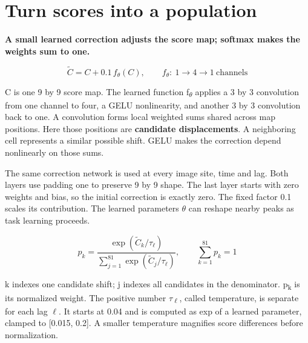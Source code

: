 \documentclass[11pt,letterpaper]{article}
\begin{document}
\clearpage
\section{Turn scores into a population}\label{sec7}

\textbf{A small learned correction adjusts the score map; softmax makes the weights sum to one.}


\begin{equation}\widetilde C=C+0.1\,f_\theta(C),\qquad f_\theta:\ 1\to4\to1\ \mathrm{channels}\end{equation}

C is one 9 by 9 score map. The learned function f\textsubscript{\(\theta\)} applies a 3 by 3 convolution from one channel to four, a GELU nonlinearity, and another 3 by 3 convolution back to one. A convolution forms local weighted sums shared across map positions. Here those positions are \textbf{candidate displacements}. A neighboring cell represents a similar possible shift. GELU makes the correction depend nonlinearly on those sums.


The same correction network is used at every image site, time and lag. Both layers use padding one to preserve 9 by 9 shape. The last layer starts with zero weights and bias, so the initial correction is exactly zero. The fixed factor 0.1 scales its contribution. The learned parameters \(\theta\) can reshape nearby peaks as task learning proceeds.


\begin{equation}p_k=\frac{\exp(\widetilde C_k/\tau_\ell)}{\sum_{j=1}^{81}\exp(\widetilde C_j/\tau_\ell)},\qquad \sum_{k=1}^{81}p_k=1\end{equation}

k indexes one candidate shift; j indexes all candidates in the denominator. p\textsubscript{k} is its normalized weight. The positive number \(\tau\)\textsubscript{\(\ell\)}, called temperature, is separate for each lag \(\ell\). It starts at 0.04 and is computed as exp of a learned parameter, clamped to [0.015, 0.2]. A smaller temperature magnifies score differences before normalization.
\end{document}

